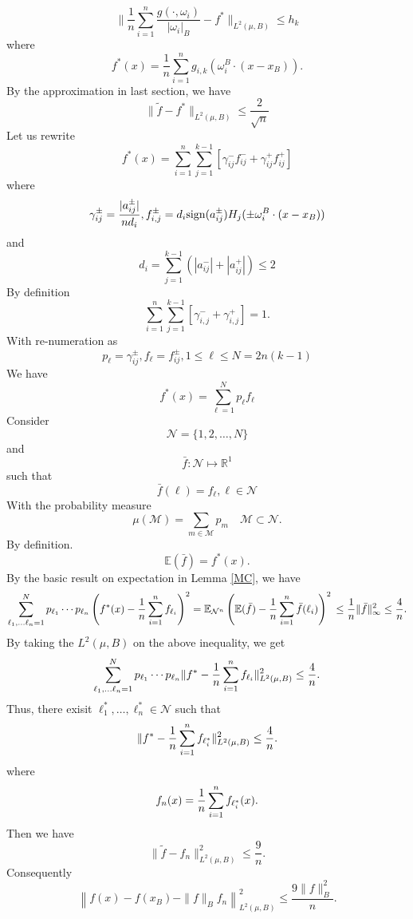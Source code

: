 \begin{equation}
	\|\frac1n \sum_{i=1}^n \frac{g(\cdot,\omega_i)}{|\omega_i|_B}-f^*\|_{L^2(\mu,B)}\le h_k
\end{equation}
where
\begin{equation}
	\label{fstar}
	f^*(x)=
	\frac1n\sum_{i=1}^ng_{i,k}(\omega_i^B\cdot (x-x_B)).
\end{equation}
By the approximation in last section, we have 
\begin{equation}
	\|\tilde f-f^*\|_{L^2(\mu,B)}\le \frac{2}{\sqrt{n}}
\end{equation}
Let us rewrite
$$
f^*(x)
=\sum_{i=1}^n\sum_{j=1}^{k-1}[\gamma_{ij}^- f_{ij}^-+ \gamma_{ij}^+f_{ij}^+]
$$
where
$$
\gamma_{ij}^{\pm}=\frac{|a^\pm_{ij}|}{nd_i}, 
f^\pm_{i,j}=d_i\/{\rm sign}(a^\pm_{ij})H_j(\pm \omega_i^B\cdot (x-x_B))
$$
and 
$$
d_i=\sum_{j=1}^{k-1}(|a^-_{ij}|+|a^+_{ij}|)\le 2
$$
By definition
\begin{equation}
	\label{gammaij}
	\sum_{i=1}^n\sum_{j=1}^{k-1}[\gamma_{i,j}^-+\gamma_{i,j}^+]=1.
\end{equation}
With re-numeration as
$$
p_\ell=\gamma_{ij}^{\pm}, f_\ell = f_{ij}^{\pm}, 1\le \ell \le N=2n(k-1)
$$
We have
$$
f^*(x)=\sum_{\ell=1}^N p_\ell f_\ell
$$
Consider 
$$
\mathcal N=\{1,2,\ldots, N\}
$$
and 
$$
\bar f: \mathcal N\mapsto \mathbb R^1
$$
such that
$$
\bar  f(\ell)=f_{\ell}, \ell\in \mathcal N
$$
With the probability measure
$$
\mu(\mathcal M)=\sum_{m\in \mathcal M}p_m \quad \mathcal M\subset\mathcal N.
$$
By definition. 
$$
\mathbb E(\bar  f) = f^*(x).
$$
By the basic result on expectation in Lemma \ref{MC}, we have
$$
\sum_{\ell_1,\ldots \ell_n=1}^Np_{\ell_1}\cdots p_{\ell_n}\left(f^*(x)-
{1\over n}\sum_{i=1}^n f_{\ell_i}\right)^2
=\mathbb E_{\mathcal N^n} \left(\mathbb E(\bar f)-{1\over
	n}\sum_{i=1}^n  \bar  f(\ell_i)\right)^2\\
\le\frac1n \|\bar  f\|_{\infty}^2 \le\frac4n.
$$
By taking the $L^2(\mu,B)$ on the above inequality, we get
$$
\sum_{\ell_1,\ldots \ell_n=1}^Np_{\ell_1}\cdots p_{\ell_n}\|f^*-{1\over n}\sum_{i=1}^n f_{\ell_i}\|_{L^2(\mu,B)}^2
\le\frac4n.
$$
Thus, there exisit $\ell_1^*, \ldots, \ell_n^*\in \mathcal N$ such that
$$
\|f^*-{1\over n}\sum_{i=1}^n f_{\ell_i^*}\|_{L^2(\mu,B)}^2
\le\frac4n.
$$
where
$$
f_n(x)={1\over n}\sum_{i=1}^n f_{\ell_i^*}(x).
$$
Then we have 
\begin{equation}
	\|\tilde f-f_n\|^2_{L^2(\mu,B)}\le \frac{9}{n}.
\end{equation}
Consequently
\begin{equation}
	\left\|f(x)-f(x_B)-\|f\|_Bf_n\right\|^2_{L^2(\mu,B)}\le \frac{9\|f\|^2_B}{n}.
\end{equation}

